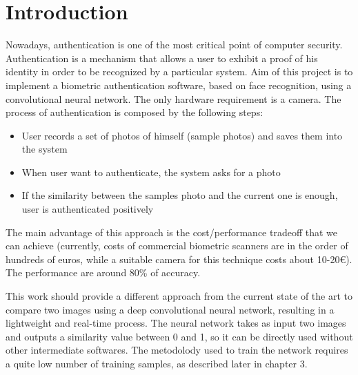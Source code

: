 \section{Introduction}

Nowadays, authentication is one of the most critical point of computer security. Authentication is a mechanism that allows a user to exhibit a proof of his identity in order to be recognized by a particular system. Aim of this project is to implement a biometric authentication software, based on face recognition, using a convolutional neural network. The only hardware requirement is a camera. The process of authentication is composed by the following steps:
\begin{itemize}
\item User records a set of photos of himself (sample photos) and saves them into the system
\item When user want to authenticate, the system asks for a photo
\item If the similarity between the samples photo and the current one is enough, user is authenticated positively
\end{itemize}
The main advantage of this approach is the cost/performance tradeoff that we can achieve (currently, costs of commercial biometric scanners are in the order of hundreds of euros, while a suitable camera for this technique costs about 10-20\euro). The performance are around 80\% of accuracy.

This work should provide a different approach from the current state of the art to compare two images using a deep convolutional neural network, resulting in a lightweight and real-time process. The neural network takes as input two images and outputs a similarity value between 0 and 1, so it can be directly used without other intermediate softwares. The metodolody used to train the network requires a quite low number of training samples, as described later in chapter 3.
